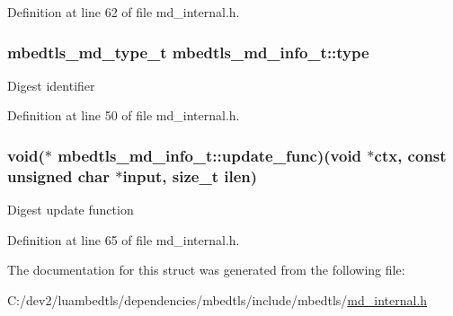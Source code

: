 Definition at line 62 of file md\-\_\-internal.\-h.

\hypertarget{structmbedtls__md__info__t_ae27d588a1b1a7c4f96384fc5705f5c3d}{
\subsubsection[{type}]{\setlength{\rightskip}{0pt plus 5cm}mbedtls\-\_\-md\-\_\-type\-\_\-t mbedtls\-\_\-md\-\_\-info\-\_\-t\-::type}}\label{structmbedtls__md__info__t_ae27d588a1b1a7c4f96384fc5705f5c3d}
Digest identifier 

Definition at line 50 of file md\-\_\-internal.\-h.

\hypertarget{structmbedtls__md__info__t_a7bb49e033b3b8a1def01f393f40bbef1}{
\subsubsection[{update\-\_\-func}]{\setlength{\rightskip}{0pt plus 5cm}void($\ast$ mbedtls\-\_\-md\-\_\-info\-\_\-t\-::update\-\_\-func)(void $\ast$ctx, const unsigned char $\ast$input, size\-\_\-t ilen)}}\label{structmbedtls__md__info__t_a7bb49e033b3b8a1def01f393f40bbef1}
Digest update function 

Definition at line 65 of file md\-\_\-internal.\-h.



The documentation for this struct was generated from the following file\-:\begin{DoxyCompactItemize}
\item 
C\-:/dev2/luambedtls/dependencies/mbedtls/include/mbedtls/\hyperlink{md__internal_8h}{md\-\_\-internal.\-h}\end{DoxyCompactItemize}
